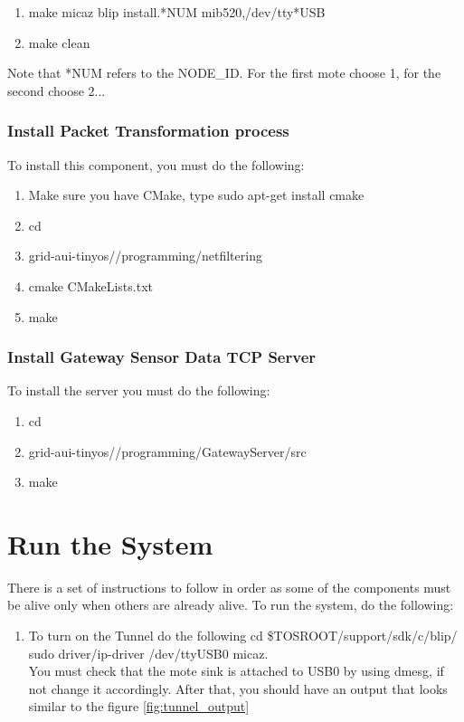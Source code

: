 \documentclass[oneside,12pt,a4paper,final]{book}
\begin{document}
\begin{appendices}
\begin{enumerate}
\item  make micaz blip install.*NUM mib520,/dev/tty*USB
\item make clean
\end{enumerate}
Note that *NUM refers to the NODE\_ID. For the first mote choose 1, for the second choose 2...

\subsection{Install Packet Transformation process}
To install this component, you must do the following:
\begin{enumerate}
\item Make sure you have CMake, type sudo apt-get install cmake
\item cd
\item grid-aui-tinyos//programming/netfiltering
\item cmake CMakeLists.txt
\item make
\end{enumerate}

\subsection{Install Gateway Sensor Data TCP Server}
To install the server you must do the following:
\begin{enumerate}
\item cd
\item grid-aui-tinyos//programming/GatewayServer/src
\item make
\end{enumerate}

\chapter{Run the System}
There is a set of instructions to follow in order as some of the components must be alive only when others are already alive. To run the system, do the following:
\begin{enumerate}
\item To turn on the Tunnel do the following
\subitem cd \$TOSROOT/support/sdk/c/blip/ 
\subitem sudo driver/ip-driver /dev/ttyUSB0 micaz. \\
 You must check that the mote sink is attached to USB0 by using dmesg, if not change it accordingly. After that, you should have an output that looks similar to the figure \ref{fig:tunnel_output}


\end{enumerate}
\end{appendices}
\end{document}
